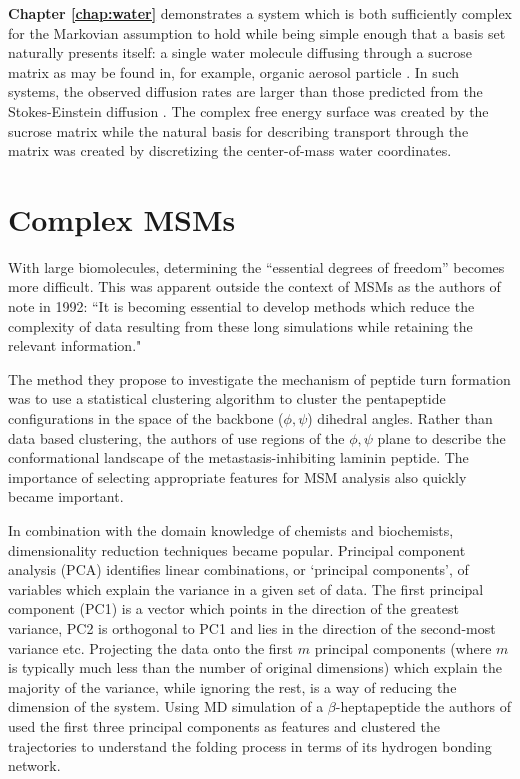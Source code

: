 \textbf{Chapter \ref{chap:water}} demonstrates a system which is both sufficiently complex for the Markovian assumption to hold while being simple enough that a basis set naturally presents itself: a single water molecule diffusing through a sucrose matrix as may be found in, for example, organic aerosol particle \cite{songTransientCavityDynamics2020a}. In such systems, the observed diffusion rates  are larger than those predicted from the Stokes-Einstein diffusion \cite{songTransientCavityDynamics2020a}. The complex free energy surface was created by the sucrose matrix while the natural basis for describing transport through the matrix was created by discretizing the center-of-mass water coordinates. 

\section{Complex MSMs}
With large biomolecules, determining the ``essential degrees of freedom'' \cite{schutteDirectApproachConformational1999} becomes more difficult. This was apparent outside the context of MSMs as the authors of \cite{karpen1993statistical} note in 1992: 
``It is becoming essential to develop methods which reduce the complexity of data resulting from these long simulations while retaining the relevant information."

The method they propose to investigate the mechanism of peptide turn formation was to use a statistical clustering algorithm to cluster the pentapeptide configurations in the space of the backbone ($\phi, \psi$) dihedral angles. Rather than data based clustering, the authors of \cite{mckelveyCHARMMAnalysisConformations1991} use regions of the $\phi, \psi$ plane to describe the conformational landscape of the metastasis-inhibiting laminin peptide. The importance of selecting appropriate features for MSM analysis also quickly became important. 

In combination with the domain knowledge of chemists and biochemists, dimensionality reduction \cite{friedman2001elements} techniques became popular.  Principal component analysis (PCA) \cite{leverPrincipalComponentAnalysis2017} identifies linear combinations, or `principal components', of variables which explain the variance in a given set of data. The first principal component (PC1) is a vector which points in the direction of the greatest variance, PC2 is orthogonal to PC1 and lies in the direction of the second-most variance etc. Projecting the data onto the first $m$ principal components (where $m$ is typically much less than the number of original dimensions) which explain the majority of the variance, while ignoring the rest, is a way of reducing the dimension of the system. Using MD simulation of a $\beta$-heptapeptide the authors of \cite{degrootEssentialDynamicsReversible2001} used the first three principal components as features and clustered the trajectories to understand the folding process in terms of its hydrogen bonding network. 

